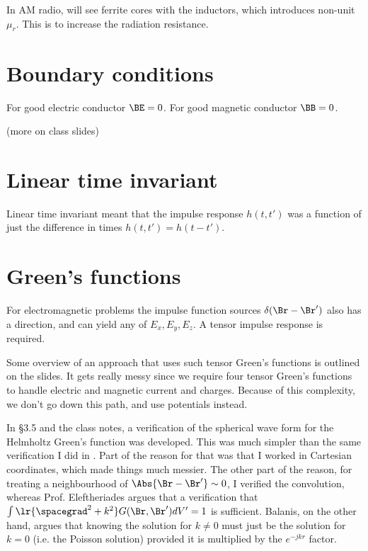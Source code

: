 In AM radio, will see ferrite cores with the inductors, which introduces non-unit \( \mu_r \).  This is to increase the radiation resistance.

\section{Boundary conditions}

For good electric conductor \( \BE = 0 \).
For good magnetic conductor \( \BB = 0 \).

(more on class slides)

\section{Linear time invariant}

Linear time invariant meant that the impulse response \( h(t,t') \) was a function of just the difference in times \( h(t,t') = h(t-t') \).

\section{Green's functions}

For electromagnetic problems the impulse function sources \( \delta(\Br - \Br') \) also has a direction, and can yield any of \( E_x, E_y, E_z \).  A tensor impulse response is required.

Some overview of an approach that uses such tensor Green's functions is outlined on the slides.  It gets really messy since we require four tensor Green's functions to handle electric and magnetic current and charges.  Because of this complexity, we don't go down this path, and use potentials instead.

In \S 3.5 \citep{balanis2005antenna} and the class notes, a verification of the spherical wave form for the Helmholtz Green's function was developed.  This was much simpler than the same verification I did in \citep{phy456:helmoltzGreens}.  Part of the reason for that was that I worked in Cartesian coordinates, which made things much messier.  The other part of the reason, for treating a neighbourhood of \( \Abs{\Br - \Br'} \sim 0 \), I verified the convolution, whereas Prof. Eleftheriades argues that a verification that \( \int \lr{\spacegrad^2 + k^2} G(\Br, \Br') dV' = 1\) is sufficient.  Balanis, on the other hand, argues that knowing the solution for \( k \ne 0 \) must just be the solution for \( k = 0 \) (i.e. the Poisson solution) provided it is multiplied by the \( e^{-j k r} \) factor.

